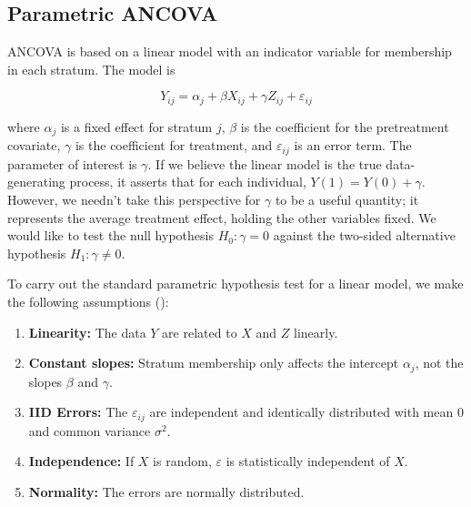 \documentclass[12pt]{article}
\begin{document}
\subsection{Parametric ANCOVA}\label{subsec:ancova}

ANCOVA is based on a linear model with an indicator variable for membership in each stratum.
The model is

\begin{equation}\label{eqn:ancova}
Y_{ij} = \alpha_j + \beta X_{ij} + \gamma Z_{ij} + \varepsilon_{ij}
\end{equation}

\noindent where $\alpha_j$ is a fixed effect for stratum $j$, $\beta$ is the coefficient for the pretreatment covariate,
$\gamma$ is the coefficient for treatment,
and $\varepsilon_{ij}$ is an error term.
The parameter of interest is $\gamma$. 
If we believe the linear model is the true data-generating process, it asserts that for each individual, $Y(1) = Y(0) + \gamma$.
However, we needn't take this perspective for $\gamma$ to be a useful quantity; it represents the average treatment effect, holding the other variables fixed.
We would like to test the null hypothesis $H_0: \gamma = 0$ against
the two-sided alternative hypothesis $H_1: \gamma \neq 0$.

To carry out the standard parametric hypothesis test for a linear model, we make the following assumptions (\cite{freedman_statistical_2005}):

\begin{enumerate}
\item \textbf{Linearity:} The data $Y$ are related to $X$ and $Z$ linearly.
\item \textbf{Constant slopes:} Stratum membership only affects the intercept $\alpha_j$, not the slopes $\beta$ and $\gamma$.
\item \textbf{IID Errors:} The $\varepsilon_{ij}$ are independent and identically distributed with mean $0$ and common variance $\sigma^2$.
\item \textbf{Independence:} If $X$ is random, $\varepsilon$ is statistically independent of $X$.
\item \textbf{Normality:} The errors are normally distributed.
\end{enumerate}
\end{document}
